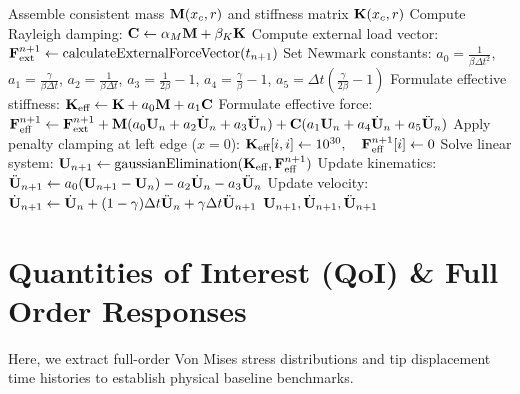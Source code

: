 \begin{algorithm}[htbp]
    \caption{Full Order Model (FOM) Implicit Dynamics Solver}
    \label{alg:fom_dynamics}
    \begin{algorithmic}[1]
        \State Assemble consistent mass $\mathbf{M}(x_c, r)$ and stiffness matrix $\mathbf{K}(x_c, r)$
        \State Compute Rayleigh damping: $\mathbf{C} \gets \alpha_M \mathbf{M} + \beta_K \mathbf{K}$
        \State Compute external load vector: $\mathbf{F}_{\text{ext}}^{n+1} \gets \text{calculateExternalForceVector}(t_{n+1})$
        \State Set Newmark constants: $a_0 = \frac{1}{\beta \Delta t^2}$, $a_1 = \frac{\gamma}{\beta \Delta t}$, $a_2 = \frac{1}{\beta \Delta t}$, $a_3 = \frac{1}{2\beta} - 1$, $a_4 = \frac{\gamma}{\beta} - 1$, $a_5 = \Delta t \left( \frac{\gamma}{2\beta} - 1 \right)$
        \State Formulate effective stiffness: $\mathbf{K}_{\text{eff}} \gets \mathbf{K} + a_0 \mathbf{M} + a_1 \mathbf{C}$
        \State Formulate effective force: $\mathbf{F}_{\text{eff}}^{n+1} \gets \mathbf{F}_{\text{ext}}^{n+1} + \mathbf{M}(a_0 \mathbf{U}_n + a_2 \dot{\mathbf{U}}_n + a_3 \ddot{\mathbf{U}}_n) + \mathbf{C}(a_1 \mathbf{U}_n + a_4 \dot{\mathbf{U}}_n + a_5 \ddot{\mathbf{U}}_n)$
        \State Apply penalty clamping at left edge ($x=0$): $\mathbf{K}_{\text{eff}}[i, i] \gets 10^{30}, \quad \mathbf{F}_{\text{eff}}^{n+1}[i] \gets 0$
        \State Solve linear system: $\mathbf{U}_{n+1} \gets \text{gaussianElimination}(\mathbf{K}_{\text{eff}}, \mathbf{F}_{\text{eff}}^{n+1})$
        \State Update kinematics: $\ddot{\mathbf{U}}_{n+1} \gets a_0 (\mathbf{U}_{n+1} - \mathbf{U}_n) - a_2 \dot{\mathbf{U}}_n - a_3 \ddot{\mathbf{U}}_n$
        \State Update velocity: $\dot{\mathbf{U}}_{n+1} \gets \dot{\mathbf{U}}_n + (1 - \gamma)\Delta t \ddot{\mathbf{U}}_n + \gamma \Delta t \ddot{\mathbf{U}}_{n+1}$
        \State \Return $\mathbf{U}_{n+1}, \dot{\mathbf{U}}_{n+1}, \ddot{\mathbf{U}}_{n+1}$
        \EndProcedure
    \end{algorithmic}
\end{algorithm}
\newpage

\section{Quantities of Interest (QoI) \& Full Order Responses}

Here, we extract full-order Von Mises stress distributions and tip displacement time histories to establish physical baseline benchmarks.

